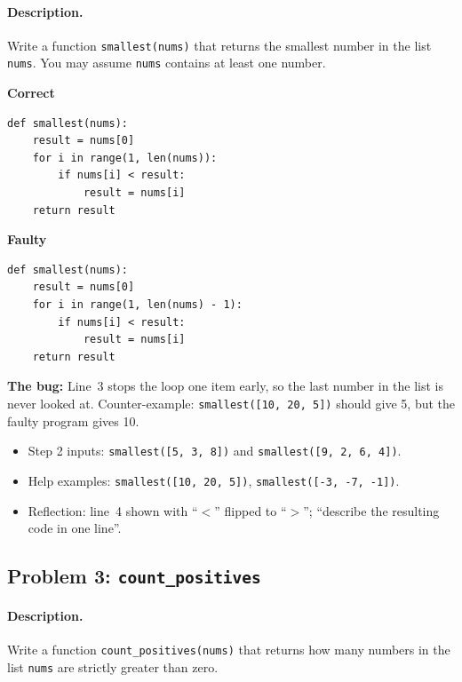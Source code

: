 \documentclass[11pt,a4paper]{article}
\newenvironment{codepair}{\par\noindent}{\par\medskip}
\newcommand{\codelabel}[1]{\textbf{\small #1}\par\vspace{2pt}}
\newcommand{\bugnote}[1]{\par\noindent\textcolor{bugred}{\textbf{The bug:}} #1\par\smallskip}
\begin{document}
\paragraph{Description.} Write a function \texttt{smallest(nums)} that
returns the smallest number in the list \texttt{nums}. You may assume
\texttt{nums} contains at least one number.

\begin{codepair}
\begin{minipage}[t]{0.48\textwidth}
\codelabel{Correct}
\begin{lstlisting}
def smallest(nums):
    result = nums[0]
    for i in range(1, len(nums)):
        if nums[i] < result:
            result = nums[i]
    return result
\end{lstlisting}
\end{minipage}\hfill
\begin{minipage}[t]{0.48\textwidth}
\codelabel{Faulty}
\begin{lstlisting}
def smallest(nums):
    result = nums[0]
    for i in range(1, len(nums) - 1):
        if nums[i] < result:
            result = nums[i]
    return result
\end{lstlisting}
\end{minipage}
\end{codepair}

\bugnote{Line~3 stops the loop one item early, so the last number in the
list is never looked at. Counter-example: \texttt{smallest([10, 20, 5])}
should give 5, but the faulty program gives 10.}

\begin{itemize}[nosep]
  \item Step 2 inputs: \texttt{smallest([5, 3, 8])} and
        \texttt{smallest([9, 2, 6, 4])}.
  \item Help examples: \texttt{smallest([10, 20, 5])},
        \texttt{smallest([-3, -7, -1])}.
  \item Reflection: line~4 shown with ``$<$'' flipped to ``$>$'';
        ``describe the resulting code in one line''.
\end{itemize}

\subsection{Problem 3: \texttt{count\_positives}}

\paragraph{Description.} Write a function \texttt{count\_positives(nums)}
that returns how many numbers in the list \texttt{nums} are strictly
greater than zero.
\end{document}
